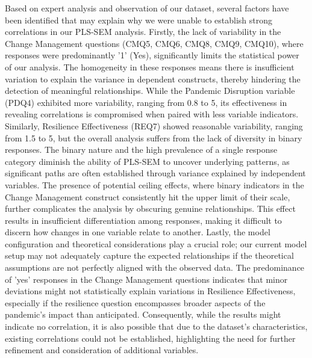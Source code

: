 Based on expert analysis and observation of our dataset, several factors have been identified that may explain why we were unable to establish strong correlations in our PLS-SEM analysis. Firstly, the lack of variability in the Change Management questions (CMQ5, CMQ6, CMQ8, CMQ9, CMQ10), where responses were predominantly '1' (Yes), significantly limits the statistical power of our analysis. The homogeneity in these responses means there is insufficient variation to explain the variance in dependent constructs, thereby hindering the detection of meaningful relationships. While the Pandemic Disruption variable (PDQ4) exhibited more variability, ranging from 0.8 to 5, its effectiveness in revealing correlations is compromised when paired with less variable indicators. Similarly, Resilience Effectiveness (REQ7) showed reasonable variability, ranging from 1.5 to 5, but the overall analysis suffers from the lack of diversity in binary responses. The binary nature and the high prevalence of a single response category diminish the ability of PLS-SEM to uncover underlying patterns, as significant paths are often established through variance explained by independent variables. The presence of potential ceiling effects, where binary indicators in the Change Management construct consistently hit the upper limit of their scale, further complicates the analysis by obscuring genuine relationships. This effect results in insufficient differentiation among responses, making it difficult to discern how changes in one variable relate to another. Lastly, the model configuration and theoretical considerations play a crucial role; our current model setup may not adequately capture the expected relationships if the theoretical assumptions are not perfectly aligned with the observed data. The predominance of 'yes' responses in the Change Management questions indicates that minor deviations might not statistically explain variations in Resilience Effectiveness, especially if the resilience question encompasses broader aspects of the pandemic's impact than anticipated. Consequently, while the results might indicate no correlation, it is also possible that due to the dataset's characteristics, existing correlations could not be established, highlighting the need for further refinement and consideration of additional variables.
















